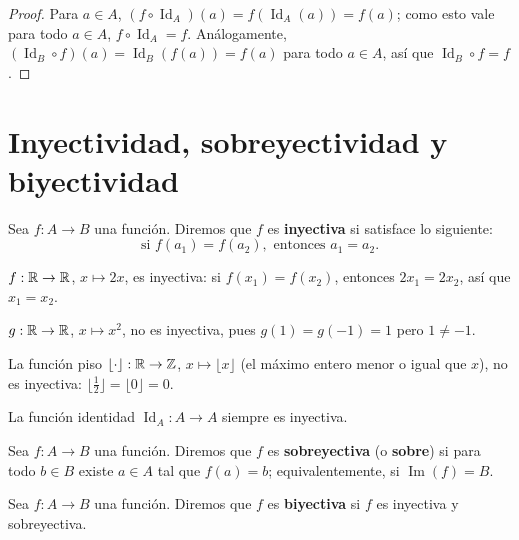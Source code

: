 \documentclass[12pt,a4paper]{book}
\begin{document}
    \begin{proof}
        Para $a\in A$, $(f\circ\operatorname{Id}_A)(a) = f(\operatorname{Id}_A(a)) = f(a)$; como esto vale para todo $a\in A$, $f\circ\operatorname{Id}_A=f$. Análogamente, $(\operatorname{Id}_B\circ f)(a) = \operatorname{Id}_B(f(a)) = f(a)$ para todo $a\in A$, así que $\operatorname{Id}_B\circ f=f$.
    \end{proof}

    \section{Inyectividad, sobreyectividad y biyectividad}

    \begin{definicion}
        Sea $f:A\to B$ una función. Diremos que $f$ es \textbf{inyectiva} si satisface lo siguiente:
        \begin{equation*}
            \text{si } f(a_1)=f(a_2), \text{ entonces } a_1=a_2.
        \end{equation*}
    \end{definicion}

    \begin{ejemplo}
        $f:\mathbb{R}\to\mathbb{R}$, $x\mapsto 2x$, es inyectiva: si $f(x_1)=f(x_2)$, entonces $2x_1=2x_2$, así que $x_1=x_2$.

        $g:\mathbb{R}\to\mathbb{R}$, $x\mapsto x^2$, no es inyectiva, pues $g(1)=g(-1)=1$ pero $1\neq -1$.

        La función piso $\lfloor\cdot\rfloor:\mathbb{R}\to\mathbb{Z}$, $x\mapsto\lfloor x\rfloor$ (el máximo entero menor o igual que $x$), no es inyectiva: $\lfloor \tfrac12\rfloor = \lfloor 0\rfloor = 0$.

        La función identidad $\operatorname{Id}_A:A\to A$ siempre es inyectiva.
    \end{ejemplo}

    \begin{definicion}
        Sea $f:A\to B$ una función. Diremos que $f$ es \textbf{sobreyectiva} (o \textbf{sobre}) si para todo $b\in B$ existe $a\in A$ tal que $f(a)=b$; equivalentemente, si $\operatorname{Im}(f)=B$.
    \end{definicion}

    \begin{definicion}
        Sea $f:A\to B$ una función. Diremos que $f$ es \textbf{biyectiva} si $f$ es inyectiva y sobreyectiva.
    \end{definicion}
\end{document}
